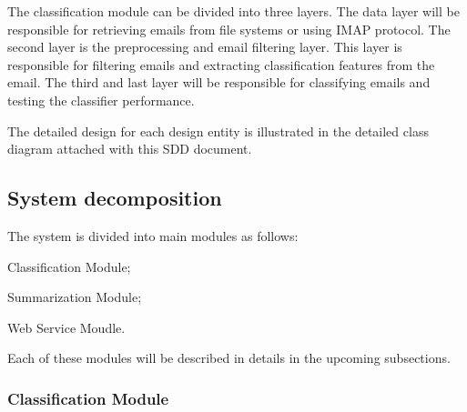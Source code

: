 \documentclass[12pt]{article}
\newenvironment{my_itemize}
{\begin{itemize}
  \setlength{\itemsep}{0cm}
  \setlength{\parskip}{0cm}}
{\end{itemize}}
\begin{document}
The classification module can be divided into three layers. The data layer will be 
responsible for retrieving emails from file systems or using IMAP protocol. The 
second layer is the preprocessing and email filtering layer. This layer is 
responsible for filtering emails and extracting classification features from the 
email. The third and last layer will be responsible for classifying emails and 
testing the classifier performance.

The detailed design for each design entity is illustrated in the detailed class 
diagram attached with this SDD document.


\subsection{System decomposition}
The system is divided into main modules as follows:
\begin{my_itemize}
\item Classification Module;
\item Summarization Module;
\item Web Service Moudle.
\end{my_itemize}
Each of these modules will be described in details in the upcoming subsections.

\subsubsection{Classification Module}
\end{document}
